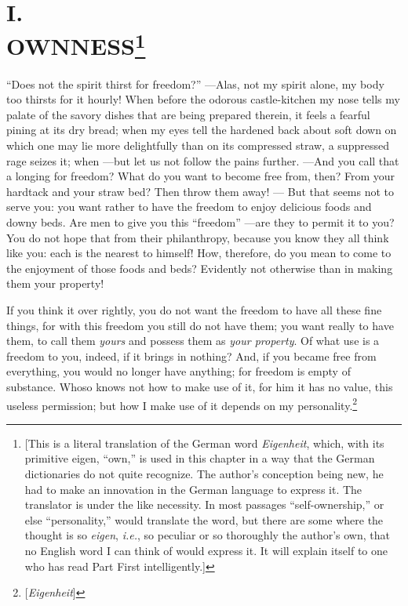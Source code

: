 
\chapter[I. Ownness]{\centering I.\\
OWNNESS\footnote{[This is a literal translation of the German word 
\textit{Eigenheit}, which, with its primitive eigen, ``own,'' is used in 
this chapter in a way that the German dictionaries do not quite recognize. The 
author's conception being new, he had to make an innovation in the German 
language to express it. The translator is under the like necessity. In most 
passages ``self-ownership,'' or else ``personality,'' would translate the 
word, but there are some where the thought is so \textit{eigen}, \textit{i.e.},
so peculiar or so thoroughly the author's own, that no English word I can 
think of would express it. It will explain itself to one who has read Part 
First intelligently.]}}

``Does not the spirit thirst for freedom?'' ---Alas, not my spirit alone, my 
body too thirsts for it hourly! When before the odorous castle-kitchen my nose 
tells my palate of the savory dishes that are being prepared therein, it feels 
a fearful pining at its dry bread; when my eyes tell the hardened back about 
soft down on which one may lie more delightfully than on its compressed straw, 
a suppressed rage seizes it; when ---but let us not follow the pains further. ---And you call that a longing for freedom? What do you want to become free 
from, then? From your hardtack and your straw bed? Then throw them away! --- 
But that seems not to serve you: you want rather to have the freedom to enjoy 
delicious foods and downy beds. Are men to give you this ``freedom'' ---are 
they to permit it to you? You do not hope that from their philanthropy, 
because you know they all think like you: each is the nearest to himself! How, 
therefore, do you mean to come to the enjoyment of those foods and beds? 
Evidently not otherwise than in making them your property!

If you think it over rightly, you do not want the freedom to have all these 
fine things, for with this freedom you still do not have them; you want really 
to have them, to call them \textit{yours} and possess them as \textit{your 
property}. Of what use is a freedom to you, indeed, if it brings in nothing? 
And, if you became free from everything, you would no longer have anything; 
for freedom is empty of substance. Whoso knows not how to make use of it, for 
him it has no value, this useless permission; but how I make use of it depends 
on my personality.\footnote{[\textit{Eigenheit}]}

